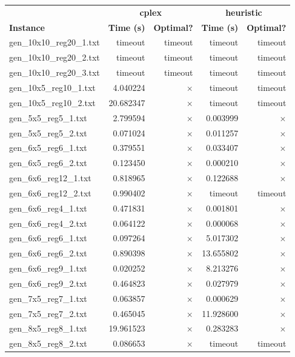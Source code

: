 \documentclass{article}
\begin{document}
\begin{center}
\renewcommand{\arraystretch}{1.4}
 \begin{tabular}{lrrrr}
	\hline
 & \multicolumn{2}{c}{\textbf{cplex}} & \multicolumn{2}{c}{\textbf{heuristic}}\\
\textbf{Instance}  & \textbf{Time (s)} & \textbf{Optimal?}  & \textbf{Time (s)} & \textbf{Optimal?} \\\hline

gen\_10x10\_reg20\_1.txt & timeout & timeout & timeout & timeout\\
gen\_10x10\_reg20\_2.txt & timeout & timeout & timeout & timeout\\
gen\_10x10\_reg20\_3.txt & timeout & timeout & timeout & timeout\\
gen\_10x5\_reg10\_1.txt & 4.040224 & $\times$ & timeout & timeout\\
gen\_10x5\_reg10\_2.txt & 20.682347 & $\times$ & timeout & timeout\\
gen\_5x5\_reg5\_1.txt & 2.799594 & $\times$ & 0.003999 & $\times$\\
gen\_5x5\_reg5\_2.txt & 0.071024 & $\times$ & 0.011257 & $\times$\\
gen\_6x5\_reg6\_1.txt & 0.379551 & $\times$ & 0.033407 & $\times$\\
gen\_6x5\_reg6\_2.txt & 0.123450 & $\times$ & 0.000210 & $\times$\\
gen\_6x6\_reg12\_1.txt & 0.818965 & $\times$ & 0.122688 & $\times$\\
gen\_6x6\_reg12\_2.txt & 0.990402 & $\times$ & timeout & timeout\\
gen\_6x6\_reg4\_1.txt & 0.471831 & $\times$ & 0.001801 & $\times$\\
gen\_6x6\_reg4\_2.txt & 0.064122 & $\times$ & 0.000068 & $\times$\\
gen\_6x6\_reg6\_1.txt & 0.097264 & $\times$ & 5.017302 & $\times$\\
gen\_6x6\_reg6\_2.txt & 0.890398 & $\times$ & 13.655802 & $\times$\\
gen\_6x6\_reg9\_1.txt & 0.020252 & $\times$ & 8.213276 & $\times$\\
gen\_6x6\_reg9\_2.txt & 0.464823 & $\times$ & 0.027979 & $\times$\\
gen\_7x5\_reg7\_1.txt & 0.063857 & $\times$ & 0.000629 & $\times$\\
gen\_7x5\_reg7\_2.txt & 0.465045 & $\times$ & 11.928600 & $\times$\\
gen\_8x5\_reg8\_1.txt & 19.961523 & $\times$ & 0.283283 & $\times$\\
gen\_8x5\_reg8\_2.txt & 0.086653 & $\times$ & timeout & timeout\\
\hline\end{tabular}
\end{center}
\end{document}
